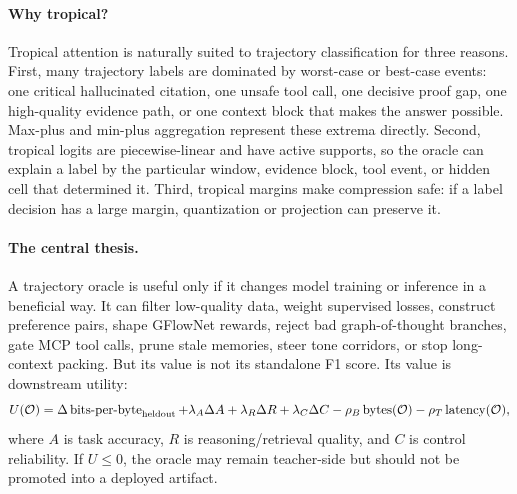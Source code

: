 \documentclass[11pt]{article}
\theoremstyle{definition}
\theoremstyle{remark}
\newcommand{\bits}{\operatorname{bits\mbox{-}per\mbox{-}byte}}
\numberwithin{equation}{section}
\begin{document}
\paragraph{Why tropical?}
Tropical attention is naturally suited to trajectory classification for three reasons.  First, many trajectory labels are dominated by worst-case or best-case events: one critical hallucinated citation, one unsafe tool call, one decisive proof gap, one high-quality evidence path, or one context block that makes the answer possible.  Max-plus and min-plus aggregation represent these extrema directly.  Second, tropical logits are piecewise-linear and have active supports, so the oracle can explain a label by the particular window, evidence block, tool event, or hidden cell that determined it.  Third, tropical margins make compression safe: if a label decision has a large margin, quantization or projection can preserve it.

\paragraph{The central thesis.}
A trajectory oracle is useful only if it changes model training or inference in a beneficial way.  It can filter low-quality data, weight supervised losses, construct preference pairs, shape GFlowNet rewards, reject bad graph-of-thought branches, gate MCP tool calls, prune stale memories, steer tone corridors, or stop long-context packing.  But its value is not its standalone F1 score.  Its value is downstream utility:
\begin{equation}
    U(\mathcal O)=\Delta \bits_{\rm heldout}+\lambda_A\Delta A+\lambda_R\Delta R+\lambda_C\Delta C-\rho_B\operatorname{bytes}(\mathcal O)-\rho_T\operatorname{latency}(\mathcal O),
\end{equation}
where \(A\) is task accuracy, \(R\) is reasoning/retrieval quality, and \(C\) is control reliability.  If \(U\le 0\), the oracle may remain teacher-side but should not be promoted into a deployed artifact.
\end{document}
